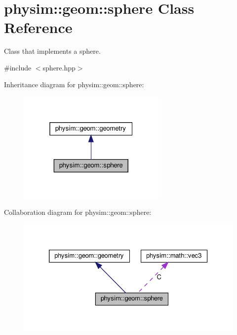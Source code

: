 \hypertarget{classphysim_1_1geom_1_1sphere}{}\section{physim\+:\+:geom\+:\+:sphere Class Reference}
\label{classphysim_1_1geom_1_1sphere}


Class that implements a sphere.  




{\ttfamily \#include $<$sphere.\+hpp$>$}



Inheritance diagram for physim\+:\+:geom\+:\+:sphere\+:\nopagebreak
\begin{figure}[H]
\begin{center}
\leavevmode
\includegraphics[width=205pt]{classphysim_1_1geom_1_1sphere__inherit__graph}
\end{center}
\end{figure}


Collaboration diagram for physim\+:\+:geom\+:\+:sphere\+:\nopagebreak
\begin{figure}[H]
\begin{center}
\leavevmode
\includegraphics[width=326pt]{classphysim_1_1geom_1_1sphere__coll__graph}
\end{center}
\end{figure}
